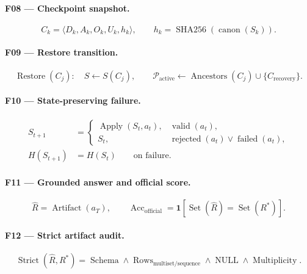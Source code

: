 \documentclass[12pt]{article}
\begin{document}
\paragraph{F08 — Checkpoint snapshot.}
\[
C_k=\langle D_k,A_k,O_k,U_k,h_k\rangle,
\qquad
h_k=\operatorname{SHA256}\!\left(\operatorname{canon}(S_k)\right).
\]

\paragraph{F09 — Restore transition.}
\[
\operatorname{Restore}(C_j):\quad
S\leftarrow S(C_j),\qquad
\mathcal{P}_{\mathrm{active}}
\leftarrow \operatorname{Ancestors}(C_j)\cup\{C_{\mathrm{recovery}}\}.
\]

\paragraph{F10 — State-preserving failure.}
\[
\begin{aligned}
S_{t+1}&=
\begin{cases}
\operatorname{Apply}(S_t,a_t), & \operatorname{valid}(a_t),\\
S_t, & \operatorname{rejected}(a_t)\lor\operatorname{failed}(a_t),
\end{cases}\\[3pt]
H(S_{t+1})&=H(S_t)\qquad\text{on failure}.
\end{aligned}
\]

\paragraph{F11 — Grounded answer and official score.}
\[
\widehat{R}=\operatorname{Artifact}(a_T),
\qquad
\operatorname{Acc}_{\mathrm{official}}
=\mathbf{1}\!\left[\operatorname{Set}(\widehat{R})
=\operatorname{Set}(R^*)\right].
\]

\paragraph{F12 — Strict artifact audit.}
\[
\operatorname{Strict}(\widehat{R},R^*)
=\operatorname{Schema}\land
\operatorname{Rows}_{\mathrm{multiset/sequence}}\land
\operatorname{NULL}\land
\operatorname{Multiplicity}.
\]
\end{document}
